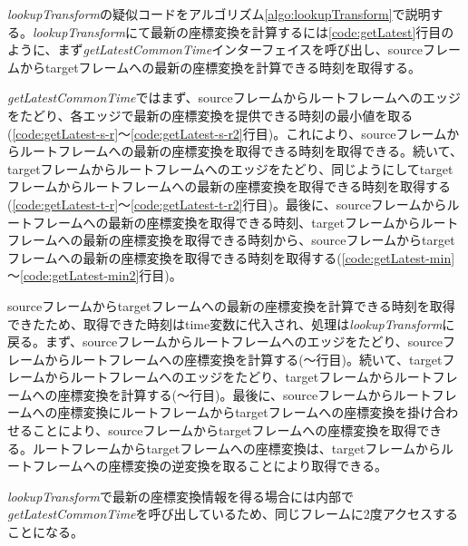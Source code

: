 \documentclass[a4paper]{jreport}	%
\begin{document}
\textit{lookupTransform}の疑似コードをアルゴリズム\ref{algo:lookupTransform}で説明する。\textit{lookupTransform}にて最新の座標変換を計算するには\ref{code:getLatest}行目のように、まず\textit{getLatestCommonTime}インターフェイスを呼び出し、sourceフレームからtargetフレームへの最新の座標変換を計算できる時刻を取得する。

\textit{getLatestCommonTime}ではまず、sourceフレームからルートフレームへのエッジをたどり、各エッジで最新の座標変換を提供できる時刻の最小値を取る(\ref{code:getLatest-s-r}〜\ref{code:getLatest-s-r2}行目)。これにより、sourceフレームからルートフレームへの最新の座標変換を取得できる時刻を取得できる。続いて、targetフレームからルートフレームへのエッジをたどり、同じようにしてtargetフレームからルートフレームへの最新の座標変換を取得できる時刻を取得する(\ref{code:getLatest-t-r}〜\ref{code:getLatest-t-r2}行目)。最後に、sourceフレームからルートフレームへの最新の座標変換を取得できる時刻、targetフレームからルートフレームへの最新の座標変換を取得できる時刻から、sourceフレームからtargetフレームへの最新の座標変換を取得できる時刻を取得する(\ref{code:getLatest-min} 〜\ref{code:getLatest-min2}行目)。

sourceフレームからtargetフレームへの最新の座標変換を計算できる時刻を取得できたため、取得できた時刻はtime変数に代入され、処理は\textit{lookupTransform}に戻る。まず、sourceフレームからルートフレームへのエッジをたどり、sourceフレームからルートフレームへの座標変換を計算する(\label{code:lookupTrans-s-r}〜\label{code:lookupTrans-s-r2}行目)。続いて、targetフレームからルートフレームへのエッジをたどり、targetフレームからルートフレームへの座標変換を計算する(\label{code:lookupTrans-t-r}〜\label{code:lookupTrans-t-r2}行目)。最後に、sourceフレームからルートフレームへの座標変換にルートフレームからtargetフレームへの座標変換を掛け合わせることにより、sourceフレームからtargetフレームへの座標変換を取得できる。ルートフレームからtargetフレームへの座標変換は、targetフレームからルートフレームへの座標変換の逆変換を取ることにより取得できる。

\textit{lookupTransform}で最新の座標変換情報を得る場合には内部で\textit{getLatestCommonTime}を呼び出しているため、同じフレームに2度アクセスすることになる。
\end{document}
